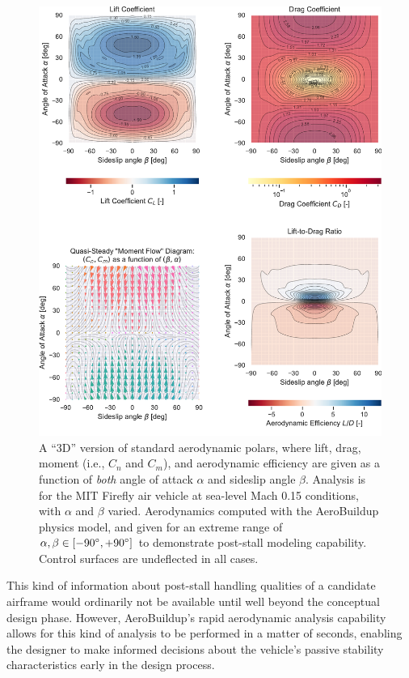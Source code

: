 \begin{figure}[H]
    \centering
    \includegraphics[width=\textwidth]{../figures/aerobuildup_figs/high_alpha.pdf}
    \caption{A ``3D'' version of standard aerodynamic polars, where lift, drag, moment (i.e., $C_n$ and $C_m$), and aerodynamic efficiency are given as a function of \emph{both} angle of attack $\alpha$ and sideslip angle $\beta$. Analysis is for the MIT Firefly air vehicle at sea-level Mach 0.15 conditions, with $\alpha$ and $\beta$ varied. Aerodynamics computed with the AeroBuildup physics model, and given for an extreme range of $\alpha, \beta \in [-90\degree, +90\degree]$ to demonstrate post-stall modeling capability. Control surfaces are undeflected in all cases.}
    \label{fig:ab_high_aoa}
\end{figure}

This kind of information about post-stall handling qualities of a candidate airframe would ordinarily not be available until well beyond the conceptual design phase. However, AeroBuildup's rapid aerodynamic analysis capability allows for this kind of analysis to be performed in a matter of seconds, enabling the designer to make informed decisions about the vehicle's passive stability characteristics early in the design process.

